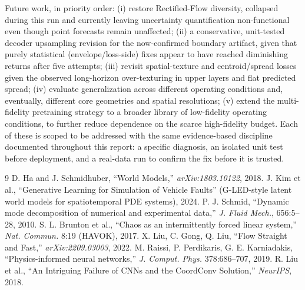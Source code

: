 \documentclass[11pt]{article}
\begin{document}
Future work, in priority order: (i) restore Rectified-Flow diversity, collapsed during this run and currently leaving uncertainty quantification non-functional even though point forecasts remain unaffected; (ii) a conservative, unit-tested decoder upsampling revision for the now-confirmed boundary artifact, given that purely statistical (envelope/loss-side) fixes appear to have reached diminishing returns after five attempts; (iii) revisit spatial-texture and centroid/spread losses given the observed long-horizon over-texturing in upper layers and flat predicted spread; (iv) evaluate generalization across different operating conditions and, eventually, different core geometries and spatial resolutions; (v) extend the multi-fidelity pretraining strategy to a broader library of low-fidelity operating conditions, to further reduce dependence on the scarce high-fidelity budget. Each of these is scoped to be addressed with the same evidence-based discipline documented throughout this report: a specific diagnosis, an isolated unit test before deployment, and a real-data run to confirm the fix before it is trusted.

{\small
\begin{thebibliography}{9}
 D. Ha and J. Schmidhuber, ``World Models,'' \emph{arXiv:1803.10122}, 2018.
 J. Kim et al., ``Generative Learning for Simulation of Vehicle Faults'' (G-LED-style latent world models for spatiotemporal PDE systems), 2024.
 P. J. Schmid, ``Dynamic mode decomposition of numerical and experimental data,'' \emph{J. Fluid Mech.}, 656:5--28, 2010.
 S. L. Brunton et al., ``Chaos as an intermittently forced linear system,'' \emph{Nat. Commun.} 8:19 (HAVOK), 2017.
 X. Liu, C. Gong, Q. Liu, ``Flow Straight and Fast,'' \emph{arXiv:2209.03003}, 2022.
 M. Raissi, P. Perdikaris, G. E. Karniadakis, ``Physics-informed neural networks,'' \emph{J. Comput. Phys.} 378:686--707, 2019.
 R. Liu et al., ``An Intriguing Failure of CNNs and the CoordConv Solution,'' \emph{NeurIPS}, 2018.
\end{thebibliography}
}
\end{document}
